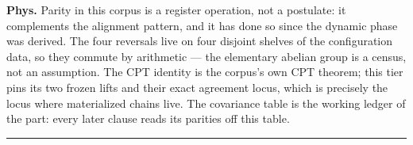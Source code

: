 \begin{theorem}
\textbf{Phys.} Parity in this corpus is a register operation, not a postulate: it complements the alignment pattern, and it has done so since the dynamic phase was derived. The four reversals live on four disjoint shelves of the configuration data, so they commute by arithmetic — the elementary abelian group is a census, not an assumption. The CPT identity is the corpus's own CPT theorem; this tier pins its two frozen lifts and their exact agreement locus, which is precisely the locus where materialized chains live. The covariance table is the working ledger of the part: every later clause reads its parities off this table.

\vspace{2pt}\noindent\rule{\textwidth}{0.4pt}\vspace{2pt}

\end{theorem}

